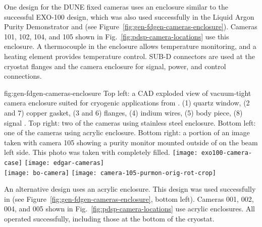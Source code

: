 One design for the DUNE fixed cameras uses an enclosure similar to
the successful EXO-100 design\cite{Delaquis:2013hva}, which was also
used successfully in the Liquid Argon Purity Demonstrator
and  (see Figure~\ref{fig:gen-fdgen-cameras-enclosure}). Cameras 101, 102, 104, and 105 shown in Fig.~\ref{fig:pdsp-camera-locations} use this enclosure.
A thermocouple in the enclosure allows temperature monitoring, and a heating element provides temperature control.  
SUB-D connectors are used at the cryostat flanges and the camera enclosure for signal, power, and control connections.

\begin{dunefigure}{fig:gen-fdgen-cameras-enclosure}
  {Top left: a CAD exploded view of vacuum-tight camera enclosure suited for cryogenic applications from \cite{Delaquis:2013hva}.
    (1) quartz window, (2 and 7) copper gasket, (3 and 6) flanges, (4) indium wires, (5) body piece, (8) signal \fdth.
    Top right: two of the  cameras using stainless steel enclosure. 
    Bottom left: one of the  cameras using acrylic enclosure.
    Bottom right: a portion of an image taken with  camera 105 showing a purity monitor mounted outside of  on the beam left side. This photo was taken with  completely filled.
  }
  \texttt{[image: exo100-camera-case]}%
  \texttt{[image: edgar-cameras]}\\
  \hfill \texttt{[image: bo-camera]}%
  \hfill \texttt{[image: camera-105-purmon-orig-rot-crop]}%
  \hfill
\end{dunefigure}

An alternative design uses an acrylic enclosure.
This design was used successfully in  (see Figure~\ref{fig:gen-fdgen-cameras-enclosure}, bottom left). Cameras 001, 002, 004, and 005 shown in Fig.~\ref{fig:pdsp-camera-locations} use acrylic enclosures. 
All operated successfully, including those at the bottom of the cryostat.


